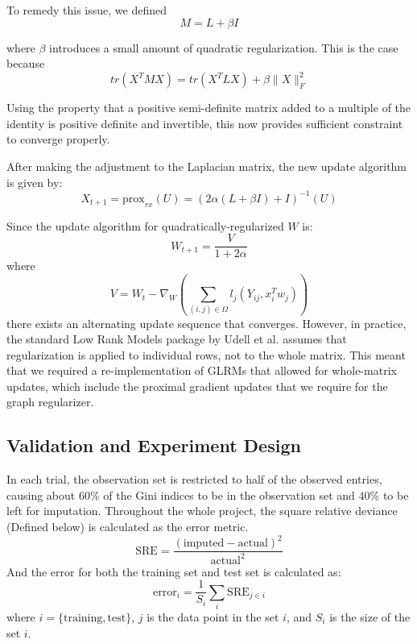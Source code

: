 \documentclass[a4paper]{article}
\begin{document}
To remedy this issue, we defined
\begin{equation*}
M = L + \beta I
\end{equation*}

where $\beta$ introduces a small amount of quadratic regularization. This is the case because
\begin{equation*}
tr(X^TMX) = tr(X^TLX) + \beta\|X\|_F^2
\end{equation*}

Using the property that a positive semi-definite matrix added to a multiple of the identity is positive definite and invertible, this now provides sufficient constraint to converge properly.

After making the adjustment to the Laplacian matrix, the new update algorithm is given by:
\begin{equation*}
X_{t+1} = \text{prox}_{rx}(U) = (2\alpha(L + \beta I) + I)^{-1}(U)
\end{equation*}

Since the update algorithm for quadratically-regularized $W$ is:
\begin{equation*}
W_{t+1} = \frac{V}{1 + 2\alpha}
\end{equation*}
where
\begin{equation*}
V = W_t - \nabla_W (\sum_{(i,j)\in \Omega}l_j(Y_{ij},x_i^Tw_j))
\end{equation*}
there exists an alternating update sequence that converges.
However, in practice, the standard Low Rank Models package by Udell et al. assumes that regularization is applied to individual rows, not to the whole matrix. This meant that we required a re-implementation of GLRMs that allowed for whole-matrix updates, which include the proximal gradient updates that we require for the graph regularizer.

\subsection{Validation and Experiment Design}
In each trial, the observation set is restricted to half of the observed entries, causing about 60\% of the Gini indices to be in the observation set and 40\% to be left for imputation. Throughout the whole project, the square relative deviance (Defined below) is calculated as the error metric. 
\begin{equation*}
\text{SRE} = \frac{(\text{imputed}-\text{actual})^2}{\text{actual}^2}
\end{equation*}
And the error for both the training set and test set is calculated as:
\begin{equation*}
\text{error}_i=\frac{1}{S_i}\sum_{i}\text{SRE}_{j\in i}
\end{equation*}
where $i=\{\text{training},\text{test}\}$, $j$ is the data point in the set $i$, and $S_i$ is the size of the set $i$.
\end{document}
